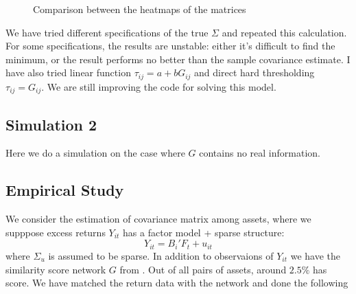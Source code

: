         \begin{figure}[tbp]
            \centering
            \caption{Comparison between the heatmaps of the matrices}
            \label{fig:1}
        \end{figure}        

        
        We have tried different specifications of the true \(\Sigma\) and repeated this calculation. For some specifications, the results are unstable: either it's difficult to find the minimum, or the result performs no better than the sample covariance estimate. I have also tried linear function \(\tau_{ij} = a + bG_{ij}\) and direct hard thresholding \(\tau_{ij} = G_{ij}\).  We are still improving the code for solving this model.
    \subsection{Simulation 2}
        Here we do a simulation on the case where \(G\) contains no real information. 
        
    \newpage
    \subsection{Empirical Study}
        We consider the estimation of covariance matrix among assets, where we supppose excess returns \(Y_{it}\) has a factor model + sparse structure:
        \begin{equation*}
            Y_{it} = B_{i} ' F_{t} + u_{it}
        \end{equation*}
        where \(\Sigma_{u}\) is assumed to be sparse. In addition to observaions of \(Y_{it}\) we have the similarity score network \(G\) from \cite{hoberg2016TextBasedNetwork}. Out of all pairs of assets, around \(2.5\%\) has score. We have matched the return data with the network and done the following
        

